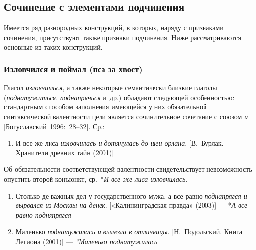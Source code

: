 \subsection{Сочинение с элементами
подчинения}\label{ux441ux43eux447ux438ux43dux435ux43dux438ux435-ux441-ux44dux43bux435ux43cux435ux43dux442ux430ux43cux438-ux43fux43eux434ux447ux438ux43dux435ux43dux438ux44f}

Имеется ряд разнородных конструкций, в которых, наряду с признаками
сочинения, присутствуют также признаки подчинения. Ниже рассматриваются
основные из таких конструкций.

\subsubsection{Изловчился и поймал (пса за
хвост)}\label{ux438ux437ux43bux43eux432ux447ux438ux43bux441ux44f-ux438-ux43fux43eux439ux43cux430ux43b-ux43fux441ux430-ux437ux430-ux445ux432ux43eux441ux442}

Глагол \textit{изловчиться}, а также некоторые семантически близкие
глаголы (\textit{поднатужиться}, \textit{поднапрячься} и~др.) обладают
следующей особенностью: стандартным способом заполнения имеющейся у них
обязательной синтаксической валентности цели является сочинительное
сочетание с союзом \textit{и} {[}Богуславский~1996:~28--32{]}. Ср.:

\begin{enumerate}
\def\labelenumi{(\arabic{enumi})}
\setcounter{enumi}{48}
\item
  И все же лиса \textit{изловчилась и дотянулась} \textit{до шеи орлана}.
  {[}В.~Бурлак. Хранители древних тайн (2001){]}
\end{enumerate}

Об обязательности соответствующей валентности свидетельствует
невозможность опустить второй конъюнкт, ср.~*\textit{И все же лиса
изловчилась}.

\begin{enumerate}
\def\labelenumi{(\arabic{enumi})}
\setcounter{enumi}{49}
\item
  Столько-де важных дел у государственного мужа, а все равно
  \textit{поднапрягся и вырвался из Москвы на денек}. {[}«Калининградская
  правда» (2003){]} --- *\textit{А все равно подняпрягся}
\item
  Маленько \textit{поднатужилась и вылезла в отличницы}. {[}Н.~Подольский.
  Книга Легиона (2001){]} --- \textit{*Маленько поднатужилась}
\end{enumerate}

